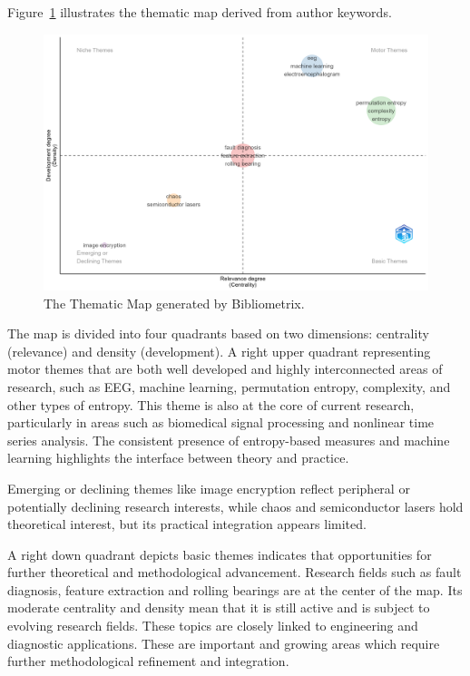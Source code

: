 Figure~\ref{fig:ThematicMap} illustrates the thematic map derived from author keywords.

\begin{figure}[H]
	\centering
	\includegraphics[width=\textwidth]{ThematicMap-2025-06-20}
	\caption{The Thematic Map generated by Bibliometrix.}
	\label{fig:ThematicMap}
\end{figure}

The map is divided into four quadrants based on two dimensions: centrality (relevance) and density (development). 
A right upper quadrant representing motor themes that are both well developed and highly interconnected areas of research, such as EEG, machine learning, permutation entropy, complexity, and other types of entropy. This theme is also at the core of current research, particularly in areas such as biomedical signal processing and nonlinear time series analysis. The consistent presence of entropy-based measures and machine learning highlights the interface between theory and practice.

Emerging or declining themes like image encryption reflect peripheral or potentially declining research interests, while chaos and semiconductor lasers hold theoretical interest, but its practical integration appears limited.  

A right down quadrant depicts basic themes indicates that opportunities for further theoretical and methodological advancement. 
Research fields such as fault diagnosis, feature extraction and rolling bearings are at the center of the map. Its moderate centrality and density mean that it is still active and is subject to evolving research fields. These topics are closely linked to engineering and diagnostic applications. These are important and growing areas which require further methodological refinement and integration.

